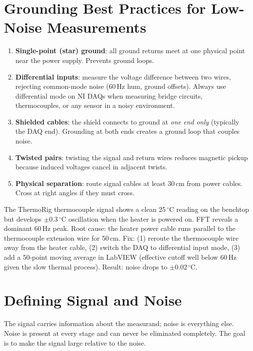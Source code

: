 \documentclass[11pt,letterpaper,twoside,openany]{book}
\newcommand{\degC}{\ensuremath{{}^{\circ}\text{C}}}
\begin{document}
\section{Grounding Best Practices for Low-Noise Measurements}
\begin{enumerate}[leftmargin=1.5em]
\item \textbf{Single-point (star) ground}: all ground returns meet at one physical point near the power supply. Prevents ground loops.
\item \textbf{Differential inputs}: measure the voltage difference between two wires, rejecting common-mode noise (60\,Hz hum, ground offsets). Always use differential mode on NI DAQs when measuring bridge circuits, thermocouples, or any sensor in a noisy environment.
\item \textbf{Shielded cables}: the shield connects to ground at \emph{one end only} (typically the DAQ end). Grounding at both ends creates a ground loop that couples noise.
\item \textbf{Twisted pairs}: twisting the signal and return wires reduces magnetic pickup because induced voltages cancel in adjacent twists.
\item \textbf{Physical separation}: route signal cables at least 30\,cm from power cables. Cross at right angles if they must cross.
\end{enumerate}

\begin{examplebox}
The ThermoRig thermocouple signal shows a clean 25\,\degC{} reading on the benchtop but develops $\pm$0.3\,\degC{} oscillation when the heater is powered on. FFT reveals a dominant 60\,Hz peak. Root cause: the heater power cable runs parallel to the thermocouple extension wire for 50\,cm. Fix: (1) reroute the thermocouple wire away from the heater cable, (2) switch the DAQ to differential input mode, (3) add a 50-point moving average in LabVIEW (effective cutoff well below 60\,Hz given the slow thermal process). Result: noise drops to $\pm$0.02\,\degC{}.
\end{examplebox}


\section{Defining Signal and Noise}
The signal carries information about the measurand; noise is everything else. Noise is present at every stage and can never be eliminated completely. The goal is to make the signal large relative to the noise.
\end{document}
